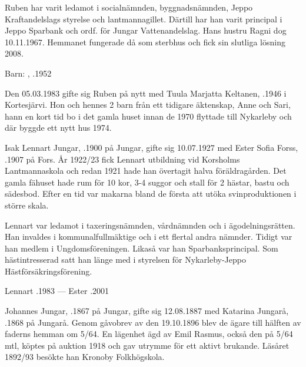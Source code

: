 Ruben har varit ledamot i socialnämnden, byggnadsnämnden, Jeppo Kraftandelslags styrelse och lantmannagillet. Därtill har han varit principal i Jeppo Sparbank och ordf. för Jungar Vattenandelslag. Hans hustru Ragni dog 10.11.1967. Hemmanet fungerade då som sterbhus och fick sin slutliga lösning 2008.

Barn: , .1952

Den 05.03.1983 gifte sig Ruben på nytt med Tuula Marjatta Keltanen, .1946 i Kortesjärvi. Hon och hennes 2 barn från ett tidigare äktenskap, Anne och Sari, hann en kort tid bo i det gamla huset innan de 1970 flyttade till Nykarleby och där byggde ett nytt hus 1974.


%
Isak Lennart Jungar, .1900 på Jungar, gifte sig 10.07.1927 med Ester Sofia Forss, .1907 på Fors. År 1922/23 fick Lennart utbildning vid Korsholms Lantmannaskola och redan 1921 hade han övertagit halva föräldragården. Det gamla fähuset hade rum för 10 kor, 3-4 suggor och stall för 2 hästar, bastu och sädesbod. Efter en tid var makarna bland de första att utöka svinproduktionen i större  skala.

Lennart var ledamot i taxeringsnämnden, vårdnämnden och i ägodelningsrätten. Han invaldes i kommunalfullmäktige och i ett
flertal andra nämnder. Tidigt var han medlem i Ungdomsföreningen. Likaså var han Sparbanksprincipal. Som hästintresserad satt han länge med i styrelsen för Nykarleby-Jeppo Hästförsäkringsförening.
\begin{jhchildren}
  \item {}
  \item {}
  \item {}
  \item {}
\end{jhchildren}

Lennart .1983  ---  Ester .2001


%
Johannes Jungar, .1867 på Jungar, gifte sig 12.08.1887 med Katarina Jungarå, .1868 på Jungarå. Genom gåvobrev av den 19.10.1896 blev de ägare till hälften av faderns hemman om 5/64. En lägenhet ägd av Emil Rasmus, också den på 5/64 mtl, köptes på auktion 1918 och gav utrymme för ett aktivt brukande. Läsåret 1892/93 besökte han Kronoby Folkhögskola.

